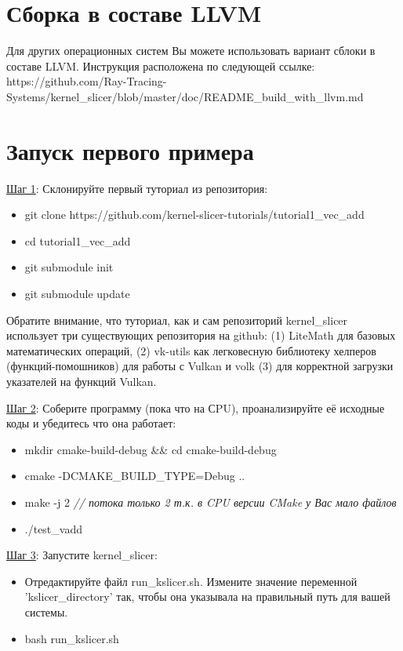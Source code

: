 \documentclass[11pt,fleqn,english,russian]{report} %
\begin{document}
\section{Сборка в составе LLVM}

Для других операционных систем Вы можете использовать вариант сблоки в составе LLVM.
Инструкция расположена по следующей ссылке:\newline
https://github.com/Ray-Tracing-Systems/kernel\_slicer/blob/master/doc/README\_build\_with\_llvm.md

\pagebreak
\section{Запуск первого примера}

\underline{Шаг 1}: Склонируйте первый туториал из репозитория:

\begin{itemize}
	\item git clone https://github.com/kernel-slicer-tutorials/tutorial1\_vec\_add
	\item cd tutorial1\_vec\_add
	\item git submodule init
	\item git submodule update
\end{itemize}

\vspace*{5px}
Обратите внимание, что туториал, как и сам репозиторий kernel\_slicer использует три существующих репозитория на github: (1) LiteMath для базовых математических операций, (2) vk-utils как легковесную библиотеку хелперов (функций-помошников) для работы с Vulkan и volk (3) для корректной загрузки указателей на функций Vulkan.

\vspace*{5px}
\noindent\underline{Шаг 2}: Соберите программу (пока что на СPU), проанализируйте её исходные коды и убедитесь что она работает: 
\begin{itemize}
	\item mkdir cmake-build-debug \&\& cd cmake-build-debug
	\item cmake -DCMAKE\_BUILD\_TYPE=Debug ..
	\item make -j 2 \textit{// потока только 2  т.к. в CPU версии CMake у Вас мало файлов} 
	\item ./test\_vadd 
\end{itemize}

\vspace*{5px}
\noindent\underline{Шаг 3}: Запустите kernel\_slicer:
\begin{itemize}
	\item Отредактируйте файл run\_kslicer.sh. Измените значение переменной 'kslicer\_directory' так, чтобы она указывала на правильный путь для вашей системы.
	\item bash run\_kslicer.sh 
\end{itemize}
\end{document}
